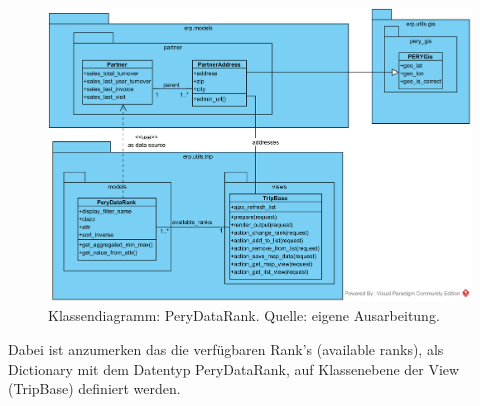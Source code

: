 \documentclass[Bachelorarbeit.tex]{subfiles}
\begin{document}
\begin{figure}[H]
\centering
\includegraphics[width=0.9\linewidth]{img/Implementierung/ClassDiagrammRank}
\caption[k]{Klassendiagramm: PeryDataRank. Quelle: eigene Ausarbeitung.}
\label{fig:ClassDiagrammRank}
\end{figure}

Dabei ist anzumerken das die verfügbaren Rank's (available ranks), als Dictionary mit dem Datentyp PeryDataRank, auf Klassenebene der View (TripBase) definiert werden.
\end{document}
